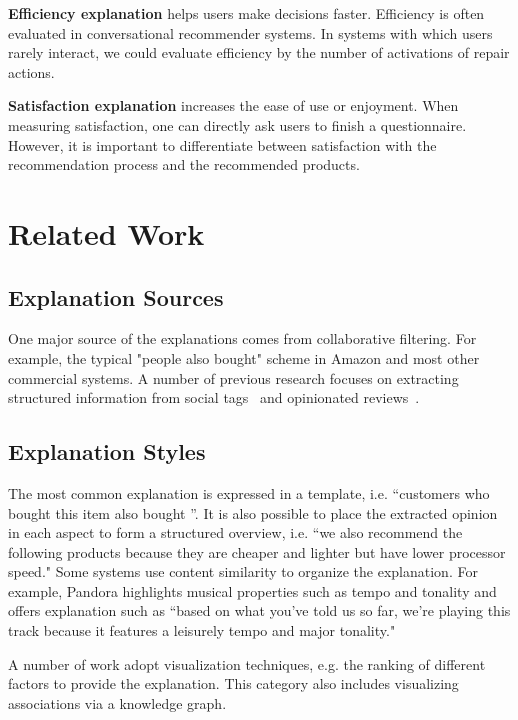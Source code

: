 \documentclass{article}
\begin{document}
\textbf{Efficiency explanation} helps users make decisions faster. Efficiency is often evaluated in conversational recommender systems. In systems with which users rarely interact, we could evaluate efficiency by the number of activations of repair actions. 

\textbf{Satisfaction explanation} increases the ease of use or enjoyment. When measuring satisfaction, one can directly ask users to finish a questionnaire. However, it is important to differentiate between satisfaction with the recommendation process and the recommended products. 






\section{Related Work}
\subsection{Explanation Sources}
One major source of the explanations comes from collaborative filtering. For example, the typical "people also bought" scheme in Amazon and most other commercial systems. A number of previous research focuses on extracting structured information from social tags~\cite{Sharma2013Do} and opinionated reviews~\cite{Zhang2014Explicit,He2015Trirank}. 

\subsection{Explanation Styles}
The most common explanation is expressed in a template, i.e. ``customers who bought this item also bought ''. It is also possible to place the extracted opinion in each aspect to form a structured overview, i.e. ``we also recommend the following products because they are cheaper and lighter but have lower processor speed." Some systems use content similarity to organize the explanation. For example, Pandora highlights musical properties such as tempo and tonality and offers explanation such as ``based on what you've told us so far, we're playing this track because it features a leisurely tempo and major tonality."

A number of work adopt visualization techniques, e.g. the ranking of different factors to provide the explanation. This category also includes visualizing associations via a knowledge graph. 
\end{document}
